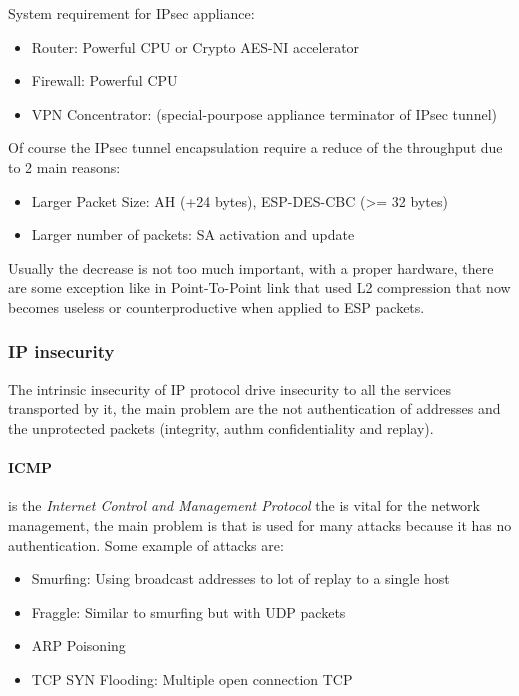 \documentclass[12pt]{article}
\begin{document}
System requirement for IPsec appliance:
\begin{itemize}
  \item Router: Powerful CPU or Crypto AES-NI accelerator
  \item Firewall: Powerful CPU
  \item VPN Concentrator: (special-pourpose appliance terminator of IPsec tunnel)
\end{itemize}
Of course the IPsec tunnel encapsulation require a reduce of the throughput due to 2 main reasons:
\begin{itemize}
  \item Larger Packet Size: AH (+24 bytes), ESP-DES-CBC (>= 32 bytes)
  \item Larger number of packets: SA activation and update
\end{itemize}
Usually the decrease is not too much important, with a proper hardware, there are some exception like in Point-To-Point link that used L2 compression that now becomes useless or counterproductive when applied to ESP packets.

\subsubsection{IP insecurity}
The intrinsic insecurity of IP protocol drive insecurity to all the services transported by it, the main problem are the not authentication of addresses and the unprotected packets (integrity, authm confidentiality and replay).\\
\paragraph{ICMP} is the \textit{Internet Control and Management Protocol} the is vital for the network management, the main problem is that is used for many attacks because it has no authentication. Some example of attacks are:
\begin{itemize}
  \item Smurfing: Using broadcast addresses to lot of replay to a single host
  \item Fraggle: Similar to smurfing but with UDP packets
  \item ARP Poisoning
  \item TCP SYN Flooding: Multiple open connection TCP
\end{itemize}
\end{document}
